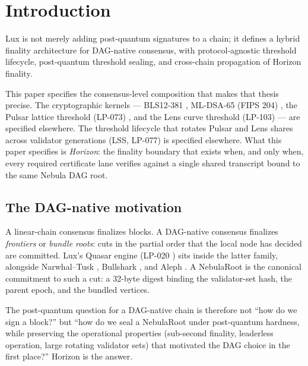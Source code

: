 \section{Introduction}
\label{sec:introduction}

Lux is not merely adding post-quantum signatures to a chain; it defines a hybrid finality architecture for DAG-native consensus, with protocol-agnostic threshold lifecycle, post-quantum threshold sealing, and cross-chain propagation of Horizon finality.

This paper specifies the consensus-level composition that makes that thesis precise. The cryptographic kernels --- BLS12-381 \cite{bls,boneh2001short,lp075}, ML-DSA-65 (FIPS 204) \cite{fips204,lp070}, the Pulsar lattice threshold (LP-073) \cite{luxpulsar,lp073}, and the Lens curve threshold (LP-103) \cite{lp103} --- are specified elsewhere. The threshold lifecycle that rotates Pulsar and Lens shares across validator generations (LSS, LP-077) \cite{luxlssmpc,lp077} is specified elsewhere. What this paper specifies is \emph{Horizon}: the finality boundary that exists when, and only when, every required certificate lane verifies against a single shared transcript bound to the same Nebula DAG root.

\subsection{The DAG-native motivation}

A linear-chain consensus finalizes blocks. A DAG-native consensus finalizes \emph{frontiers} or \emph{bundle roots}: cuts in the partial order that the local node has decided are committed. Lux's Quasar engine (LP-020 \cite{lp020}) sits inside the latter family, alongside Narwhal--Tusk \cite{narwhal}, Bullshark \cite{bullshark}, and Aleph \cite{aleph}. A NebulaRoot is the canonical commitment to such a cut: a 32-byte digest binding the validator-set hash, the parent epoch, and the bundled vertices.

The post-quantum question for a DAG-native chain is therefore not ``how do we sign a block?'' but ``how do we seal a NebulaRoot under post-quantum hardness, while preserving the operational properties (sub-second finality, leaderless operation, large rotating validator sets) that motivated the DAG choice in the first place?'' Horizon is the answer.

